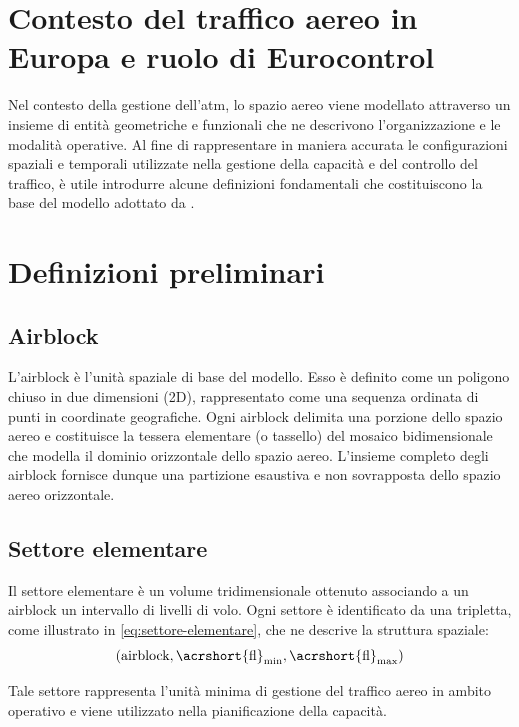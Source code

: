 \section{Contesto del traffico aereo in Europa e ruolo di Eurocontrol}

Nel contesto della gestione dell'\Gls{atm}, lo spazio aereo viene modellato attraverso un insieme di entità geometriche e funzionali che ne descrivono l’organizzazione e le modalità operative. Al fine di rappresentare in maniera accurata le configurazioni spaziali e temporali utilizzate nella gestione della capacità e del controllo del traffico, è utile introdurre alcune definizioni fondamentali che costituiscono la base del modello adottato da \citet{eurocontrol2025}.

\section{Definizioni preliminari}

\subsection{Airblock}

L’airblock è l’unità spaziale di base del modello. Esso è definito come un poligono chiuso in due dimensioni (2D), rappresentato come una sequenza ordinata di punti in coordinate geografiche. Ogni airblock delimita una porzione dello spazio aereo e costituisce la tessera elementare (o tassello) del mosaico bidimensionale che modella il dominio orizzontale dello spazio aereo. L’insieme completo degli airblock fornisce dunque una partizione esaustiva e non sovrapposta dello spazio aereo orizzontale.
\clearpage
\subsection{Settore elementare}
\label{subsec:settore-elementare}

Il settore elementare è un volume tridimensionale ottenuto associando a un airblock un intervallo di livelli di volo. Ogni settore è identificato da una tripletta, come illustrato in \eqref{eq:settore-elementare}, che ne descrive la struttura spaziale:
\begin{equation}
    (\text{airblock}, \text{\acrshort{fl}}_{\min}, \text{\acrshort{fl}}_{\max})
    \label{eq:settore-elementare}
\end{equation}

Tale settore rappresenta l’unità minima di gestione del traffico aereo in ambito operativo e viene utilizzato nella pianificazione della capacità.

